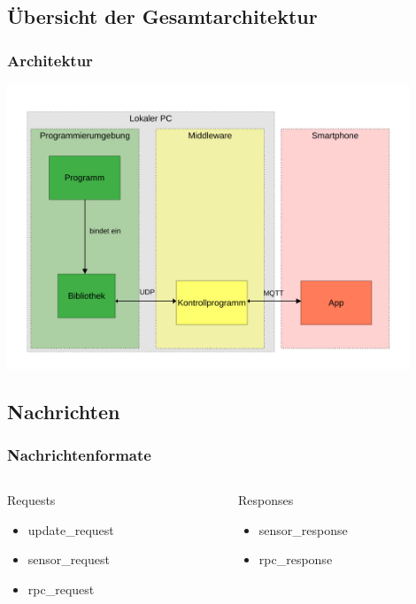 \documentclass{beamer}
\begin{document}
\subsection{Übersicht der Gesamtarchitektur}
\begin{frame}
    \frametitle[]{Architektur}
    \centering
    \includegraphics[width=0.9\textwidth]{images/framework.pdf}
\end{frame}

\subsection*{Nachrichten}
\begin{frame}
    \frametitle[]{Nachrichtenformate}
    \begin{columns}
        \begin{column}{0.5\textwidth}
        Requests
            \begin{itemize}
                \item update\_request
                \item sensor\_request
                \item rpc\_request
            \end{itemize}
        \end{column}
        
        \begin{column}{0.5\textwidth}
        Responses
        \begin{itemize}
            \item sensor\_response
            \item rpc\_response
        \end{itemize}
        \end{column}
    \end{columns}

        
\end{frame}
\end{document}
